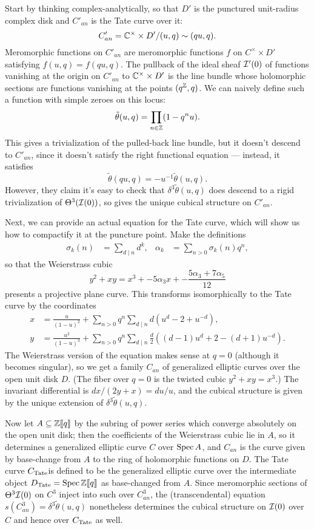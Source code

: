 Start by thinking complex-analytically, so that $D'$ is the punctured unit-radius complex disk and $C'_{an}$ is the Tate curve over it: \[C'_{an} = \mathbb{C}^\times \times D' / (u, q) \sim (qu, q).\]  Meromorphic functions on $C'_{an}$ are meromorphic functions $f$ on $C^\times \times D'$ satisfying $f(u, q) = f(qu, q)$.  The pullback of the ideal sheaf $\mathcal{I}'(0)$ of functions vanishing at the origin on $C'_{an}$ to $\mathbb{C}^\times \times D'$ is the line bundle whose holomorphic sections are functions vanishing at the points $(q^{\mathbb Z}, q)$.  We can naively define such a function with simple zeroes on this locus: \[\tilde \theta(u, q) = \prod_{n \in \mathbb Z}(1 - q^n u).\]  This gives a trivialization of the pulled-back line bundle, but it doesn't descend to $C'_{an}$, since it doesn't satisfy the right functional equation --- instead, it satisfies \[\tilde \theta(qu, q) = -u^{-1} \tilde\theta(u, q).\]  However, they claim it's easy to check that $\delta^3 \tilde\theta(u, q)$ does descend to a rigid trivialization of $\Theta^3(\mathcal{I}(0))$, so gives the unique cubical structure on $C'_{an}$.

Next, we can provide an actual equation for the Tate curve, which will show us how to compactify it at the puncture point.  Make the definitions
\begin{align*}
\sigma_k(n) & = \sum_{d \mid n} d^k, &
\alpha_k & = \sum_{n > 0} \sigma_k(n) q^n,
\end{align*}
so that the Weierstrass cubic \[y^2 + xy = x^3 + -5\alpha_3 x + -\frac{5\alpha_3 + 7\alpha_5}{12}\] presents a projective plane curve.  This transforms isomorphically to the Tate curve by the coordinates
\begin{align*}
x & = \frac{u}{(1 - u)^2} + \sum_{n > 0} q^n \sum_{d \mid n} d(u^d - 2 + u^{-d}), \\
y & = \frac{u^2}{(1 - u)^3} + \sum_{n > 0} q^n \sum_{d \mid n} \frac{d}{2} ((d - 1) u^d + 2 - (d+1)u^{-d}).
\end{align*}
The Weierstrass version of the equation makes sense at $q = 0$ (although it becomes singular), so we get a family $C_{an}$ of generalized elliptic curves over the open unit disk $D$.  (The fiber over $q = 0$ is the twisted cubic $y^2 + xy = x^3$.)  The invariant differential is $dx / (2y + x) = du / u$, and the cubical structure is given by the unique extension of $\delta^3 \tilde\theta(u, q)$.

Now let $A \subseteq \mathbb Z\llbracket{q}\rrbracket$ by the subring of power series which converge absolutely on the open unit disk; then the coefficients of the Weierstrass cubic lie in $A$, so it determines a generalized elliptic curve $C$ over $\operatorname{Spec} A$, and $C_{an}$ is the curve given by base-change from $A$ to the ring of holomorphic functions on $D$.  The Tate curve $C_{\mathrm{Tate}} $is defined to be the generalized elliptic curve over the intermediate object $D_{\mathrm{Tate}} = \operatorname{Spec} \mathbb Z\llbracket{q}\rrbracket$ as base-changed from $A$.  Since meromorphic sections of $\Theta^3 \mathcal{I}(0)$ on $C^3$ inject into such over $C_{an}^3$, the (transcendental) equation $s(C_{an}^3) = \delta^3 \tilde\theta(u, q)$ nonetheless determines the cubical structure on $\mathcal{I}(0)$ over $C$ and hence over $C_{\mathrm{Tate}}$ as well.

